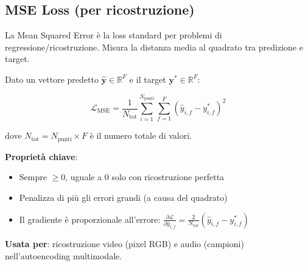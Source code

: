 \documentclass[12pt,a4paper]{article}
\begin{document}
\subsection{MSE Loss (per ricostruzione)}

La Mean Squared Error \`e la loss standard per problemi di regressione/ricostruzione. Misura la distanza media al quadrato tra predizione e target.

\begin{formulabox}
Dato un vettore predetto $\hat{\mathbf{y}} \in \mathbb{R}^F$ e il target $\mathbf{y}^* \in \mathbb{R}^F$:

\[
\mathcal{L}_{\text{MSE}} = \frac{1}{N_{\text{tot}}} \sum_{i=1}^{N_{\text{punti}}} \sum_{f=1}^{F} \left(\hat{y}_{i,f} - y_{i,f}^*\right)^2
\]

dove $N_{\text{tot}} = N_{\text{punti}} \times F$ \`e il numero totale di valori.

\textbf{Propriet\`a chiave}:
\begin{itemize}
    \item Sempre $\geq 0$, uguale a $0$ solo con ricostruzione perfetta
    \item Penalizza di pi\`u gli errori grandi (a causa del quadrato)
    \item Il gradiente \`e proporzionale all'errore: $\frac{\partial \mathcal{L}}{\partial \hat{y}_{i,f}} = \frac{2}{N_{\text{tot}}}(\hat{y}_{i,f} - y_{i,f}^*)$
\end{itemize}

\textbf{Usata per}: ricostruzione video (pixel RGB) e audio (campioni) nell'autoencoding multimodale.
\end{formulabox}
\end{document}
